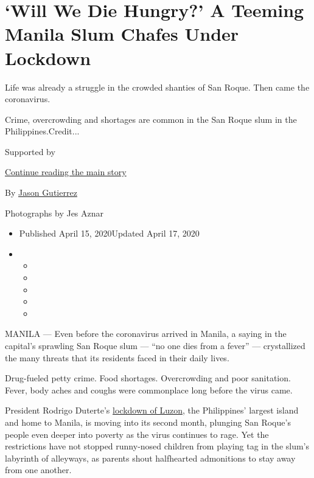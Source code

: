 \hypertarget{will-we-die-hungry-a-teeming-manila-slum-chafes-under-lockdown}{%
\section{`Will We Die Hungry?' A Teeming Manila Slum Chafes Under
Lockdown}\label{will-we-die-hungry-a-teeming-manila-slum-chafes-under-lockdown}}

Life was already a struggle in the crowded shanties of San Roque. Then
came the coronavirus.

Crime, overcrowding and shortages are common in the San Roque slum in
the Philippines.Credit...

Supported by

\protect\hyperlink{after-sponsor}{Continue reading the main story}

By \href{https://www.nytimes.com/by/jason-gutierrez}{Jason Gutierrez}

Photographs by Jes Aznar

\begin{itemize}
\item
  Published April 15, 2020Updated April 17, 2020
\item
  \begin{itemize}
  \item
  \item
  \item
  \item
  \item
  \end{itemize}
\end{itemize}

MANILA --- Even before the coronavirus arrived in Manila, a saying in
the capital's sprawling San Roque slum --- ``no one dies from a fever''
--- crystallized the many threats that its residents faced in their
daily lives.

Drug-fueled petty crime. Food shortages. Overcrowding and poor
sanitation. Fever, body aches and coughs were commonplace long before
the virus came.

President Rodrigo Duterte's
\href{https://www.rappler.com/nation/256432-duterte-extends-luzon-lockdown-april-30-2020-coronavirus-pandemic}{lockdown
of Luzon}, the Philippines' largest island and home to Manila, is moving
into its second month, plunging San Roque's people even deeper into
poverty as the virus continues to rage. Yet the restrictions have not
stopped runny-nosed children from playing tag in the slum's labyrinth of
alleyways, as parents shout halfhearted admonitions to stay away from
one another.

